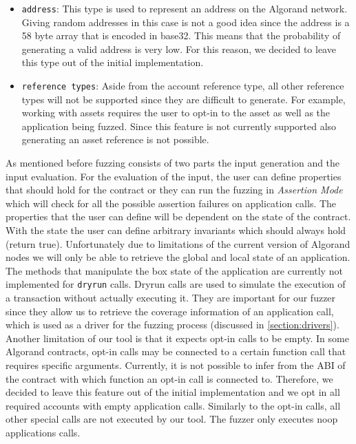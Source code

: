 \begin{itemize}
    \item \texttt{address}: This type is used to represent an address on the Algorand network.
          Giving random addresses in this case is not a good idea since the address is a 58 byte array that is encoded in base32.
          This means that the probability of generating a valid address is very low. For this reason, we decided to leave this type out of the initial implementation.
    \item \texttt{reference types}: Aside from the account reference type, all other reference types will not be supported since they are difficult to generate.
          For example, working with assets requires the user to opt-in to the asset as well as the application being fuzzed.
          Since this feature is not currently supported also generating an asset reference is not possible.
\end{itemize}

As mentioned before fuzzing consists of two parts the input generation and the input evaluation.
For the evaluation of the input, the user can define properties that should hold for the contract or they can run the fuzzing in \textit{Assertion Mode} which will check for all the possible assertion failures on application calls.
The properties that the user can define will be dependent on the state of the contract.
With the state the user can define arbitrary invariants which should always hold (return true).
Unfortunately due to limitations of the current version of Algorand nodes we will only be able to retrieve the global and local state of an application.
The methods that manipulate the box state of the application are currently not implemented for \texttt{dryrun} calls.
Dryrun calls are used to simulate the execution of a transaction without actually executing it.
They are important for our fuzzer since they allow us to retrieve the coverage information of an application call, which is used as a driver for the fuzzing process (discussed in \ref{section:drivers}).
Another limitation of our tool is that it expects opt-in calls to be empty.
In some Algorand contracts, opt-in calls may be connected to a certain function call that requires specific arguments.
Currently, it is not possible to infer from the ABI of the contract with which function an opt-in call is connected to.
Therefore, we decided to leave this feature out of the initial implementation and we opt in all required accounts with empty application calls.
Similarly to the opt-in calls, all other special calls are not executed by our tool.
The fuzzer only executes noop applications calls.

